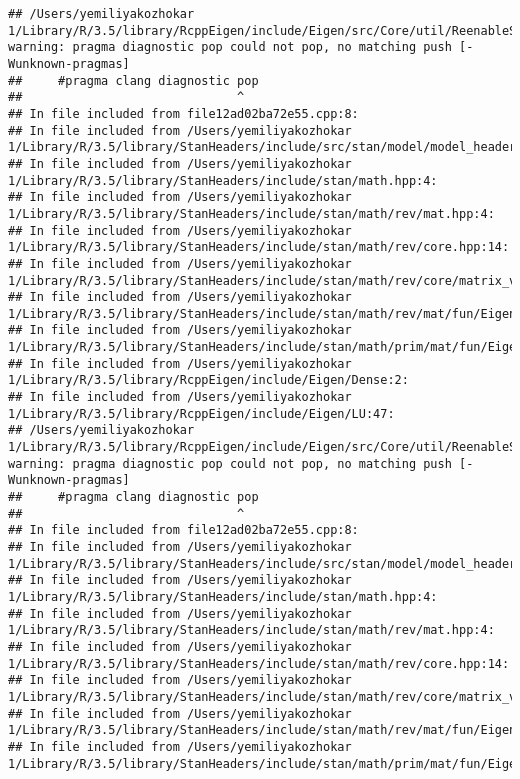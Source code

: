 \documentclass[]{article}
\begin{document}
\begin{verbatim}
## /Users/yemiliyakozhokar 1/Library/R/3.5/library/RcppEigen/include/Eigen/src/Core/util/ReenableStupidWarnings.h:10:30: warning: pragma diagnostic pop could not pop, no matching push [-Wunknown-pragmas]
##     #pragma clang diagnostic pop
##                              ^
## In file included from file12ad02ba72e55.cpp:8:
## In file included from /Users/yemiliyakozhokar 1/Library/R/3.5/library/StanHeaders/include/src/stan/model/model_header.hpp:4:
## In file included from /Users/yemiliyakozhokar 1/Library/R/3.5/library/StanHeaders/include/stan/math.hpp:4:
## In file included from /Users/yemiliyakozhokar 1/Library/R/3.5/library/StanHeaders/include/stan/math/rev/mat.hpp:4:
## In file included from /Users/yemiliyakozhokar 1/Library/R/3.5/library/StanHeaders/include/stan/math/rev/core.hpp:14:
## In file included from /Users/yemiliyakozhokar 1/Library/R/3.5/library/StanHeaders/include/stan/math/rev/core/matrix_vari.hpp:4:
## In file included from /Users/yemiliyakozhokar 1/Library/R/3.5/library/StanHeaders/include/stan/math/rev/mat/fun/Eigen_NumTraits.hpp:4:
## In file included from /Users/yemiliyakozhokar 1/Library/R/3.5/library/StanHeaders/include/stan/math/prim/mat/fun/Eigen.hpp:4:
## In file included from /Users/yemiliyakozhokar 1/Library/R/3.5/library/RcppEigen/include/Eigen/Dense:2:
## In file included from /Users/yemiliyakozhokar 1/Library/R/3.5/library/RcppEigen/include/Eigen/LU:47:
## /Users/yemiliyakozhokar 1/Library/R/3.5/library/RcppEigen/include/Eigen/src/Core/util/ReenableStupidWarnings.h:10:30: warning: pragma diagnostic pop could not pop, no matching push [-Wunknown-pragmas]
##     #pragma clang diagnostic pop
##                              ^
## In file included from file12ad02ba72e55.cpp:8:
## In file included from /Users/yemiliyakozhokar 1/Library/R/3.5/library/StanHeaders/include/src/stan/model/model_header.hpp:4:
## In file included from /Users/yemiliyakozhokar 1/Library/R/3.5/library/StanHeaders/include/stan/math.hpp:4:
## In file included from /Users/yemiliyakozhokar 1/Library/R/3.5/library/StanHeaders/include/stan/math/rev/mat.hpp:4:
## In file included from /Users/yemiliyakozhokar 1/Library/R/3.5/library/StanHeaders/include/stan/math/rev/core.hpp:14:
## In file included from /Users/yemiliyakozhokar 1/Library/R/3.5/library/StanHeaders/include/stan/math/rev/core/matrix_vari.hpp:4:
## In file included from /Users/yemiliyakozhokar 1/Library/R/3.5/library/StanHeaders/include/stan/math/rev/mat/fun/Eigen_NumTraits.hpp:4:
## In file included from /Users/yemiliyakozhokar 1/Library/R/3.5/library/StanHeaders/include/stan/math/prim/mat/fun/Eigen.hpp:4:

\end{verbatim}
\end{document}
